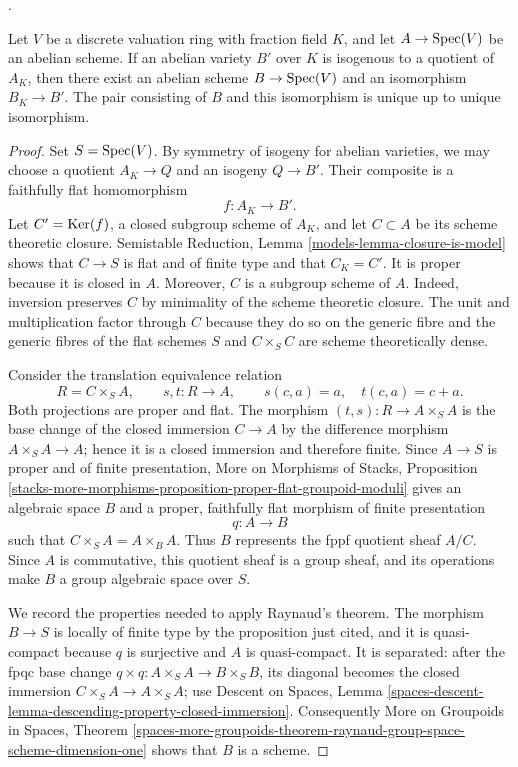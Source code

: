 \begin{proposition}
\label{proposition-abelian-good-reduction-quotient}
\begin{reference}
\cite[Expos\'e 212, Proposition 7.1, pp. 114--115]{FGA}.
\end{reference}
Let $V$ be a discrete valuation ring with fraction field $K$, and let
$A \to \mathop{\mathrm{Spec}}(V)$ be an abelian scheme. If an abelian variety $B'$ over
$K$ is isogenous to a quotient of $A_K$, then there exist an abelian
scheme $B \to \mathop{\mathrm{Spec}}(V)$ and an isomorphism $B_K \to B'$. The pair
consisting of $B$ and this isomorphism is unique up to unique isomorphism.
\end{proposition}

\begin{proof}
Set $S = \mathop{\mathrm{Spec}}(V)$. By symmetry of isogeny for abelian varieties, we may
choose a quotient $A_K \to Q$ and an isogeny $Q \to B'$. Their composite
is a faithfully flat homomorphism
$$
f : A_K \longrightarrow B'.
$$
Let $C' = \mathop{\mathrm{Ker}}(f)$, a closed subgroup scheme of $A_K$, and let
$C \subset A$ be its scheme theoretic closure. Semistable Reduction,
Lemma \ref{models-lemma-closure-is-model} shows that $C \to S$ is flat
and of finite type and that $C_K=C'$. It is proper because it is closed
in $A$. Moreover, $C$ is a subgroup scheme of $A$. Indeed, inversion
preserves $C$ by minimality of the scheme theoretic closure. The unit and
multiplication factor through $C$ because they do so on the generic fibre
and the generic fibres of the flat schemes $S$ and $C \times_S C$ are
scheme theoretically dense.

Consider the translation equivalence relation
$$
R=C\times_S A,\qquad s,t:R\longrightarrow A,
\qquad s(c,a)=a,\quad t(c,a)=c+a.
$$
Both projections are proper and flat. The morphism
$(t,s):R\to A\times_S A$ is the base change of the closed immersion
$C\to A$ by the difference morphism $A\times_S A\to A$; hence it is a
closed immersion and therefore finite. Since $A\to S$ is proper and of
finite presentation, More on Morphisms of Stacks, Proposition
\ref{stacks-more-morphisms-proposition-proper-flat-groupoid-moduli}
gives an algebraic space $B$ and a proper, faithfully flat morphism
of finite presentation
$$
q:A\longrightarrow B
$$
such that $C\times_S A=A\times_B A$. Thus $B$ represents the fppf
quotient sheaf $A/C$. Since $A$ is commutative, this quotient sheaf is a
group sheaf, and its operations make $B$ a group algebraic space over $S$.

We record the properties needed to apply Raynaud's theorem. The morphism
$B\to S$ is locally of finite type by the proposition just cited, and it
is quasi-compact because $q$ is surjective and $A$ is quasi-compact. It is
separated: after the fpqc base change
$q\times q:A\times_S A\to B\times_S B$, its diagonal becomes the closed
immersion $C\times_S A\to A\times_S A$; use Descent on Spaces, Lemma
\ref{spaces-descent-lemma-descending-property-closed-immersion}.
Consequently More on Groupoids in Spaces, Theorem
\ref{spaces-more-groupoids-theorem-raynaud-group-space-scheme-dimension-one}
shows that $B$ is a scheme.


\end{proof}
